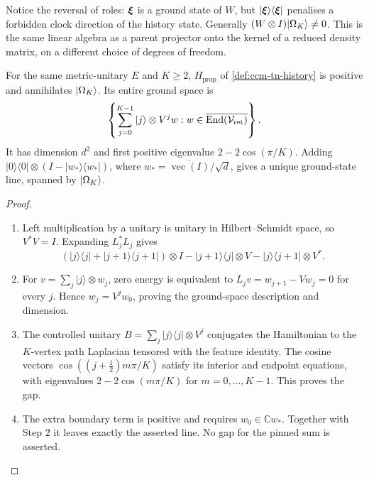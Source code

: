 Notice the reversal of roles: $\boldsymbol{\xi}$ is a ground state of $W$, but
$|\boldsymbol{\xi}\rangle\langle\boldsymbol{\xi}|$ penalises a forbidden clock direction of
the history state. Generally $(W\otimes I)|\Omega_K\rangle\ne0$.
This is the same linear algebra as a parent projector onto the kernel
of a reduced density matrix, on a different choice of degrees of freedom.

\begin{proposition}
\label{prop:ccm-tn-history-hamiltonian}
For the same metric-unitary $E$ and $K\geq2$,
$H_{\mathrm{prop}}$ of \cref{def:ccm-tn-history} is positive and
annihilates $|\Omega_K\rangle$. Its entire ground space is
\[
 \left\{\sum_{j=0}^{K-1}|j\rangle\otimes V^j w:
 w\in\overline{\operatorname{End}(\mathcal V_{\mathrm{ret}})}\right\}.
\]
It has dimension $d^2$ and first positive eigenvalue
$2-2\cos(\pi/K)$. Adding
$|0\rangle\langle0|\otimes(I-|w_*\rangle\langle w_*|)$,
where $w_*=\overline{\operatorname{vec}(I)}/\sqrt d$, gives a unique
ground-state line, spanned by $|\Omega_K\rangle$.
\end{proposition}
\begin{proof}
\begin{enumerate}
\item[$\langle1\rangle$1.] Left multiplication by a unitary is unitary
in Hilbert--Schmidt space, so $V^*V=I$. Expanding $L_j^*L_j$ gives
\[
 (|j\rangle\langle j|+|j+1\rangle\langle j+1|)\otimes I
 -|j+1\rangle\langle j|\otimes V
 -|j\rangle\langle j+1|\otimes V^*.
\]
\item[$\langle1\rangle$2.] For $v=\sum_j|j\rangle\otimes w_j$,
zero energy is equivalent to $L_jv=w_{j+1}-Vw_j=0$ for every $j$.
Hence $w_j=V^jw_0$, proving the ground-space description and dimension.
\item[$\langle1\rangle$3.] The controlled unitary
$B=\sum_j|j\rangle\langle j|\otimes V^j$ conjugates the Hamiltonian
to the $K$-vertex path Laplacian tensored with the feature identity.
The cosine vectors $\cos((j+\tfrac12)m\pi/K)$ satisfy its interior
and endpoint equations, with eigenvalues $2-2\cos(m\pi/K)$ for
$m=0,\ldots,K-1$. This proves the gap.
\item[$\langle1\rangle$4.] The extra boundary term is positive and
requires $w_0\in\mathbb Cw_*$. Together with Step 2 it leaves exactly
the asserted line. No gap for the pinned sum is asserted.
\end{enumerate}
\end{proof}

